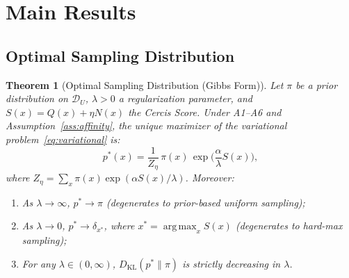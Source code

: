 \documentclass[12pt,a4paper]{article}
\newtheorem{theorem}{Theorem}[section]
\newcommand{\cD}{\mathcal{D}}
\newcommand{\argmax}{\operatorname*{arg\,max}}
\newcommand{\KL}{D_{\mathrm{KL}}}
\begin{document}
\section{Main Results}

\subsection{Optimal Sampling Distribution}

\begin{theorem}[Optimal Sampling Distribution (Gibbs Form)]
\label{thm:optimal-dist}
Let $\pi$ be a prior distribution on $\cD_U$, $\lambda>0$ a regularization parameter, and $S(x)=Q(x)+\eta N(x)$ the Cercis Score. Under A1--A6 and Assumption~\ref{ass:affinity}, the unique maximizer of the variational problem~\eqref{eq:variational} is:
\begin{equation}\label{eq:thm-dist}
    p^*(x) = \frac{1}{Z_\eta}\,
    \pi(x)\,\exp\!\Big(\frac{\alpha}{\lambda}S(x)\Big),
\end{equation}
where $Z_\eta=\sum_{x}\pi(x)\exp(\alpha S(x)/\lambda)$. Moreover:
\begin{enumerate}[label=(\roman*)]
    \item As $\lambda\to\infty$, $p^*\to\pi$ (degenerates to prior-based uniform sampling);
    \item As $\lambda\to0$, $p^*\to\delta_{x^*}$,
          where $x^*=\argmax_x S(x)$ (degenerates to hard-max sampling);
    \item For any $\lambda\in(0,\infty)$, $\KL(p^*\|\pi)$ is strictly decreasing in $\lambda$.
\end{enumerate}
\end{theorem}
\end{document}
